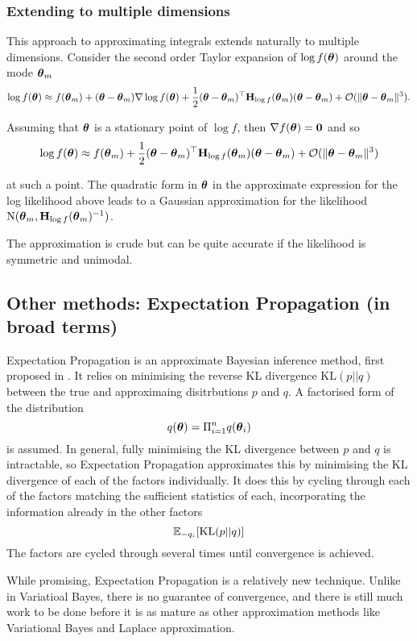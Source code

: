 \subsubsection{Extending to multiple dimensions}
This approach to approximating integrals extends naturally to multiple dimensions.
Consider the second order Taylor expansion of $\log f({\boldsymbol \theta})$ around the mode ${\boldsymbol \theta}_m$
$$
\log f({\boldsymbol \theta}) \approx f({\boldsymbol \theta}_m) + ({\boldsymbol \theta} - {\boldsymbol \theta}_m) \nabla \log f({\boldsymbol \theta}) + \frac{1}{2} ({\boldsymbol \theta} - {\boldsymbol \theta}_m)^\top {\bf H}_{\log f}({\boldsymbol \theta}_m) ({\boldsymbol \theta} - {\boldsymbol \theta}_m) + {\mathcal O}(\|{\boldsymbol \theta} - {\boldsymbol \theta}_m\|^3).
$$

Assuming that ${\boldsymbol \theta}$ is a stationary point of $\log f$, then $\nabla f({\boldsymbol \theta}) = {\bf 0}$ and so
$$
\log f({\boldsymbol \theta}) \approx f({\boldsymbol \theta}_m) + \frac{1}{2} ({\boldsymbol \theta} - {\boldsymbol \theta}_m)^\top {\bf H}_{\log f}({\boldsymbol \theta}_m) ({\boldsymbol \theta} - {\boldsymbol \theta}_m) + {\mathcal O}(\|{\boldsymbol \theta} - {\boldsymbol \theta}_m\|^3)
$$

at such a point. The quadratic form in ${\boldsymbol \theta}$ in the approximate expression for the log likelihood above
leads to a Gaussian approximation for the likelihood $\text{N}({\boldsymbol \theta}_m, {\bf H}_{\log f}({\boldsymbol \theta}_m)^{-1})$.

The approximation is crude but can be quite accurate if the likelihood is symmetric and unimodal.
\subsection{Other methods: Expectation Propagation (in broad terms)}
Expectation Propagation is an approximate Bayesian inference method, first proposed in \citep{Minka2001}.
It relies on minimising the reverse KL divergence $\text{KL}(p || q)$ between the true and approximaing
disitrbutions $p$ and $q$. A factorised form of the distribution
\[
	q({\boldsymbol \theta}) = \Pi_{i=1}^n q({\boldsymbol \theta}_i)
\]
is assumed. In general, fully minimising the KL divergence between $p$ and $q$ is intractable, so Expectation
Propagation approximates this by minimising the KL divergence of each of the factors individually.
It does this by cycling through each of the factors matching the sufficient statistics of each, incorporating
the information already in the other factors
\[
	{\mathbb E}_{-q_i} [\text{KL}(p || q)]
\]
The factors are cycled through several times until convergence is achieved.

While promising, Expectation Propagation is a relatively new technique.
Unlike in Variatioal Bayes, there is no guarantee of convergence, and there is still much work to be done
before it is as mature as other approximation methods like Variational Bayes and Laplace approximation.

